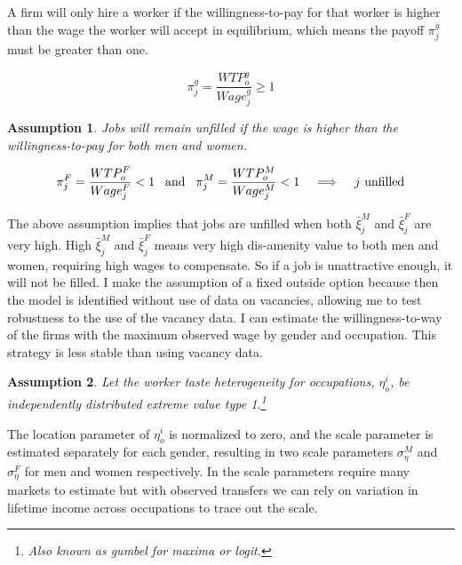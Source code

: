 \documentclass[12pt]{article}
\newtheorem{assumption}{Assumption}
\begin{document}
A firm will only hire a worker if the willingness-to-pay for that worker is higher than the wage the worker will accept in equilibrium, which means the payoff $ \pi^g_j $ must be greater than one. 

$$ \pi^g_j = \frac{WTP^g_o}{Wage^g_j} \geq 1 $$

\begin{assumption}
Jobs will remain unfilled if the wage is higher than the willingness-to-pay for both men and women.
\end{assumption}

$$ \pi^F_j = \frac{WTP^F_o}{Wage^F_j} < 1 \hspace{3mm} \text{and}  \hspace{3mm} \pi^M_j = \frac{WTP^M_o}{Wage^M_j} < 1 \hspace{3mm} \implies \hspace{3mm} \text{$j$ unfilled}$$


The above assumption implies that jobs are unfilled when both $\bar{\xi}^M_j$ and $\bar{\xi}^F_j$ are very high. High $\bar{\xi}^M_j$ and $\bar{\xi}^F_j$ means very high dis-amenity value to both men and women, requiring high wages to compensate. So if a job is unattractive enough, it will not be filled. I make the assumption of a fixed outside option because then the model is identified without use of data on vacancies, allowing me to test robustness to the use of the vacancy data. I can estimate the willingness-to-way of the firms with the maximum observed wage by gender and occupation. This strategy is less stable than using vacancy data. 


\begin{assumption}
Let the worker taste heterogeneity for occupations, $\eta^i_o$, be independently distributed extreme value type 1.\footnote{Also known as gumbel for maxima or logit.} 
\end{assumption}

The location parameter of $\eta^i_o$ is normalized to zero, and the scale parameter is estimated separately for each gender, resulting in two scale parameters $\sigma^M_{\eta}$ and $\sigma^F_{\eta}$ for men and women respectively. In  the scale parameters require many markets to estimate but with observed transfers we can rely on variation in lifetime income across occupations to trace out the scale.
\end{document}
